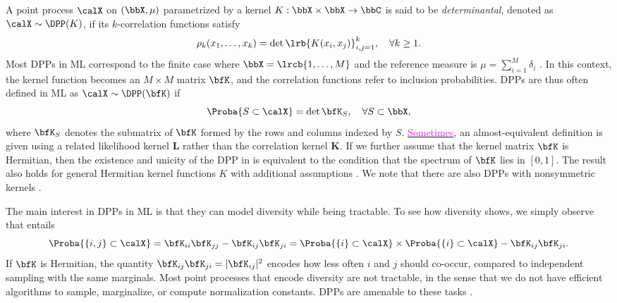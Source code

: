 A point process $\calX$ on $(\bbX,\mu)$ parametrized by a kernel $K:\bbX\times \bbX\rightarrow \bbC$ is said to be \emph{determinantal}, denoted as $\calX\sim\DPP(K)$, if its $k$-correlation functions satisfy
  \begin{equation*}
  \label{eq:k-correlation_function_DPP}
    \rho_k(x_1,\dots,x_k)
      = \det \lrb{K(x_i, x_j)}_{i,j=1}^k,
    \quad \forall k\geq 1.
  \end{equation*}
	Most DPPs in ML correspond to the finite case where $\bbX = \lrcb{1,\dots,M}$ and the reference measure is $\mu=\sum_{i=1}^M \delta_i$ \citep{KuTa12}.
	In this context, the kernel function becomes an $M\times M$ matrix $\bfK$, and the correlation functions refer to inclusion probabilities.
DPPs are thus often defined in ML as $\calX\sim \DPP(\bfK)$ if
  \begin{equation}
  \label{eq:inclusion_proba_finite}
    \Proba{S \subset \calX} = \det {\bfK}_S,
      \quad\forall S\subset \bbX,
  \end{equation}
where ${\bfK}_S$ denotes the submatrix of $\bfK$ formed by the rows and columns indexed by $S$. \href{https://dppy.readthedocs.io/en/latest/finite_dpps/definition.html}{\textcolor{magenta}{Sometimes}}, an almost-equivalent definition is given using a related likelihood kernel $\mathbf{L}$ rather than the correlation kernel $\mathbf{K}$.
If we further assume that the kernel matrix $\bfK$ is Hermitian, then the existence and unicity of the DPP in  is equivalent to the condition that the spectrum of $\bfK$ lies in $[0,1]$.
The result also holds for general Hermitian kernel functions $K$ with additional assumptions \cite[Theorem 3]{Sos00}.
We note that there are also DPPs with nonsymmetric kernels \citep{BoDiFu10}.

The main interest in DPPs in ML is that they can model diversity while being tractable.
To see how diversity shows, we simply observe that  entails
\begin{equation*}
\label{eq:2point_correlation_function_inclusion_proba_finite_case}
  \Proba{\{i,j\} \subset \calX}
    = {\bfK}_{ii}{\bfK}_{jj}-{\bfK}_{ij}{\bfK}_{ji}
    = \Proba{\{i\} \subset \calX}
      \times \Proba{\{i\} \subset \calX}
        - {\bfK}_{ij}{\bfK}_{ji}.
\end{equation*}
If $\bfK$ is Hermitian, the quantity ${\bfK}_{ij}{\bfK}_{ji} = \vert{\bfK}_{ij}\vert^2$ encodes how less often $i$ and $j$ should co-occur, compared to independent sampling with the same marginals.
Most point processes that encode diversity are not tractable, in the sense that we do not have efficient algorithms to sample, marginalize, or compute normalization constants.
DPPs are amenable to these tasks \citep{KuTa12}.


